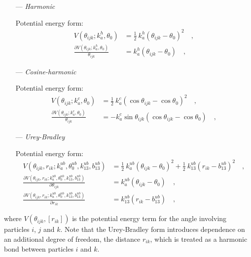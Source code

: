 \documentclass[10pt,a4paper,openany]{memoir}
\numberwithin{equation}{section}
\begin{document}
\begin{itemize}
\item [---] \textit{Harmonic}
  \par
  Potential energy form:
  \begin{align}
    \label{eq:harmonic-angle-energy}
    V(\theta_{ijk}; k_a^h, \theta_0) & = \frac{1}{2} \ k_a^h (\theta_{ijk} - \theta_0)^2 \quad , \\ \nonumber
    \frac{\partial V(\theta_{ijk}; k_a^h, \theta_0)}{\theta_{ijk}} & = k_a^h (\theta_{ijk} - \theta_0) \quad ,
  \end{align}
  
\item [---] \textit{Cosine-harmonic}
  \par
  Potential energy form:
  \begin{align}
    \label{eq:cosine-angle-energy}
    V(\theta_{ijk}; k_a^c, \theta_0) & = \frac{1}{2} \ k_a^c (\cos{\theta_{ijk}} - \cos\theta_0)^2 \quad , \\ \nonumber
    \frac{\partial V(\theta_{ijk}; k_a^c, \theta_0)}{\theta_{ijk}} & = -k_a^c \sin{\theta_{ijk}}(\cos{\theta_{ijk}} - \cos\theta_0) \quad ,
  \end{align}

\item [---] \textit{Urey-Bradley}
  \par
  Potential energy form:
  \begin{align}
    \label{eq:ub-angle-energy}
    V(\theta_{ijk},r_{ik}; k_a^{ub}, \theta^{ub}_0,k_{13}^{ub},b_{13}^{ub}) & = \frac{1}{2} \ k_a^{ub} (\theta_{ijk} - \theta_0)^2 + \frac{1}{2}  \ k_{13}^{ub} (r_{ik} - b_{13}^{ub})^2 \quad , \\ \nonumber
    \frac{\partial V(\theta_{ijk},r_{ik}; k_a^{ub}, \theta^{ub}_0,k_{13}^{ub},b_{13}^{ub})}{\partial \theta_{ijk}} & = k_a^{ub} (\theta_{ijk} - \theta_0) \quad , \\ \nonumber
    \frac{\partial V(\theta_{ijk},r_{ik}; k_a^{ub}, \theta^{ub}_0,k_{13}^{ub},b_{13}^{ub})}{\partial r_{ik}}  & = k_{13}^{ub} (r_{ik} - b_{13}^{ub}) \quad ,
  \end{align}

\end{itemize}  
\noindent
where $V(\theta_{ijk},[r_{ik}])$ is the potential energy term for the angle involving particles $i$, $j$ and $k$.
Note that the Urey-Bradley form introduces dependence on an additional degree of freedom, the distance $r_{ik}$, which is treated as a harmonic bond between particles $i$ and $k$.
\end{document}
